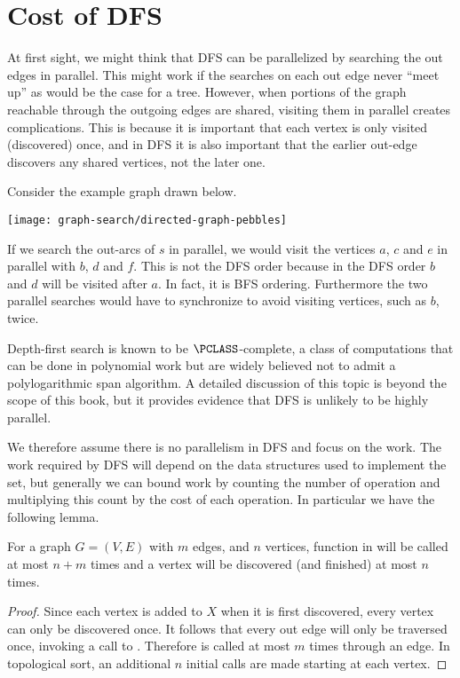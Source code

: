 \section{Cost of DFS}
At first sight, we might think that DFS can be parallelized by
searching the out edges in parallel.  This might work if the searches
on each out edge never ``meet up'' as would be the case for a tree.
However, when portions of the graph reachable through the outgoing
edges are shared, visiting them in parallel creates complications.  This
is because it is important that each vertex is only visited
(discovered) once, and in DFS it is also important that the earlier
out-edge discovers any shared vertices, not the later one.
\begin{example}
Consider the example graph drawn below.
\begin{center}
\texttt{[image: graph-search/directed-graph-pebbles]}
\end{center}
If we search the out-arcs of $s$ in parallel, we would visit the
vertices $a$, $c$ and $e$ in parallel with $b$, $d$ and $f$.  
%
This is not the DFS order because in the DFS order $b$ and $d$ will be
visited after $a$.  In fact, it is BFS ordering.  
%
Furthermore the two parallel searches would have to synchronize to
avoid visiting vertices, such as $b$, twice.
\end{example}

\begin{remark}
Depth-first search is known to be $\PCLASS$-complete, a class of
computations that can be done in polynomial work but are widely
believed not to admit a polylogarithmic span algorithm.  A detailed
discussion of this topic is beyond the scope of this book, but it
provides evidence that DFS is unlikely to be highly parallel.
\end{remark}

We therefore assume there is no parallelism in DFS and focus on the
work.  The work required by DFS will depend on the data structures
used to implement the set, but generally we can bound work by counting
the number of operation and multiplying this count by the cost of each
operation.  In particular we have the following lemma.

\begin{lemma}
  For a graph $G = (V,E)$ with $m$ edges, and $n$ vertices, 
  function in  will be called at
  most $n+m$ times and a vertex will be discovered (and finished) at
  most $n$ times.
\begin{proof}
  Since each vertex is added to $X$ when it is first discovered, every
  vertex can only be discovered once.  It follows that every out edge
  will only be traversed once, invoking a call to \dfs{}.  Therefore
  \dfs{} is called at most $m$ times through an edge.  In topological
  sort, an additional $n$ initial calls are made starting at each
  vertex.
\end{proof}
\end{lemma}

